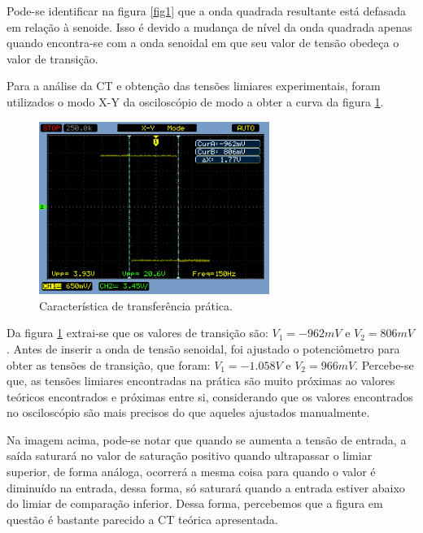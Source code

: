 Pode-se identificar na figura \ref{fig1} que a onda quadrada resultante está defasada em relação à senoide. Isso é devido a mudança de nível da onda quadrada apenas quando encontra-se com a onda senoidal em que seu valor de tensão obedeça o valor de transição.

Para a análise da CT e obtenção das tensões limiares experimentais, foram utilizados o modo X-Y da osciloscópio de modo a obter a curva da figura \ref{fig2}.

\begin{figure}[H] 
\centering
\includegraphics[width=7.5cm]{images/xy_cursors.png}
\caption{Característica de transferência prática.}
\label{fig2} 
\end{figure}

Da figura \ref{fig2} extrai-se que os valores de transição são: $V_1=-962mV$ e $V_2=806mV$. Antes de inserir a onda de tensão senoidal, foi ajustado o potenciômetro para obter as tensões de transição, que foram: $V_1=-1.058V$ e $V_2=966mV$. Percebe-se que, as tensões limiares encontradas na prática são muito próximas ao valores teóricos encontrados e próximas entre si, considerando que os valores encontrados no osciloscópio são mais precisos do que aqueles ajustados manualmente.

Na imagem acima, pode-se notar que quando se aumenta a tensão de entrada, a saída saturará no valor de saturação positivo quando ultrapassar o limiar superior, de forma análoga, ocorrerá a mesma coisa para quando o valor é diminuído na entrada, dessa forma, só saturará quando a entrada estiver abaixo do limiar de comparação inferior. Dessa forma, percebemos que a figura em questão é bastante parecido a CT teórica apresentada. 



